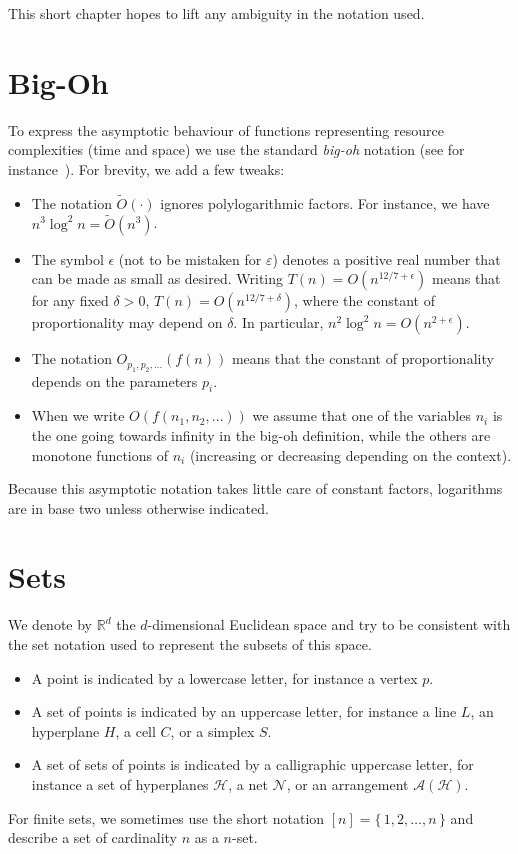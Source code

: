 
This short chapter hopes to lift any ambiguity in the notation used.

\section*{Big-Oh}

To express the asymptotic behaviour of functions representing resource
complexities (time and space) we use the standard \emph{big-oh} notation
(see for instance~\cite[Chapter~3]{CLRS09}). For brevity, we add a few
tweaks:

\begin{itemize}

\item The notation $\tilde{O}(\cdot)$ ignores polylogarithmic factors. For
	instance, we have
	\(n^3 \log^2 n = \tilde{O}(n^3)\).

\item The symbol $\epsilon$ (not to be mistaken for \(\varepsilon\))
	denotes a positive real number that can be made as small as desired.
	Writing \(T(n) = O(n^{12/7 + \epsilon})\) means that for any fixed
	\(\delta > 0\), \(T(n) = O(n^{12/7 + \delta})\), where the constant of
	proportionality may depend on \(\delta\).
	In particular, \(n^2 \log^2 n = O(n^{2 + \epsilon})\).

\item The notation \(O_{p_1,p_2, \ldots}(f(n))\) means that the constant of
	proportionality depends on the parameters \(p_i\).

\item When we write \(O(f(n_1,n_2, \ldots))\) we assume that one of the variables
	\(n_i\) is the one going towards infinity in the big-oh definition, while the
	others are monotone functions of \(n_i\) (increasing or decreasing
	depending on the context).

\end{itemize}

Because this asymptotic notation takes little care of constant factors,
logarithms are in base two unless otherwise indicated.

\section*{Sets}

We denote by \(\mathbb{R}^d\) the \(d\)-dimensional Euclidean space
and try to be consistent with the set notation used to represent the subsets
of this space.
\begin{itemize}
	\item A point is indicated by a lowercase letter, for instance a vertex \(p\).
	\item A set of points is indicated by an uppercase letter, for instance
		a line \(L\),
		an hyperplane \(H\),
		a cell \(C\),
		or a simplex \(S\).
	\item A set of sets of points is indicated by a calligraphic uppercase
		letter, for instance
		a set of hyperplanes \(\mathcal{H}\),
		a net \(\mathcal{N}\), or an arrangement \(\mathcal{A}(\mathcal{H})\).
\end{itemize}

For finite sets,
we sometimes use the short notation \([n] = \{\,1,2,\ldots ,n\,\}\) and
describe a set of cardinality \(n\) as a \(n\)-set.

